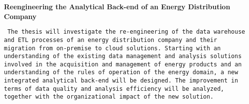 \textbf{Reengineering the Analytical Back-end of an Energy Distribution Company}

\texttt{
    The thesis will investigate the re-engineering of the data warehouse and ETL processes of an energy distribution company and their migration from on-premise to cloud solutions.
    Starting with an understanding of the existing data management and analysis solutions involved in the acquisition and management of energy products and an understanding of the rules of operation of the energy domain, a new integrated analytical back-end will be designed.
    The improvement in terms of data quality and analysis efficiency will be analyzed, together with the organizational impact of the new solution.
}